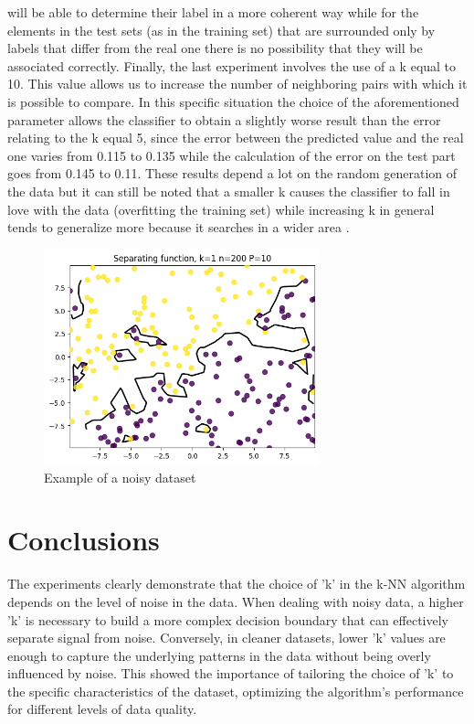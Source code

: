 \documentclass[a4paper,10pt,oneside]{article}
\begin{document}
will be able to determine their label in a more coherent way while for the elements 
in the test sets (as in the training set) that are surrounded only by labels that differ 
from the real one there is no possibility that they will be associated correctly.
Finally, the last experiment involves the use of a k equal to 10. 
This value allows us to increase the number of neighboring pairs with which it
is possible to compare. In this specific situation the choice of the aforementioned 
parameter allows the classifier to obtain a slightly worse result than the error 
relating to the k equal 5, since the error between the predicted value and the real 
one varies from 0.115 to 0.135 while the calculation of the error on the test part 
goes from 0.145 to 0.11.
These results depend a lot on the random generation of the data but it can still 
be noted that a smaller k causes the classifier to fall in love with the data 
(overfitting the training set) while increasing k in general tends to generalize 
more because it searches in a wider area . \\
\begin{figure}[h]
  \includegraphics[width=8cm]{second_experiment.png}
  \caption{ Example of a noisy dataset }
\end{figure}

\section{ Conclusions }
\label{sec:majhead}

The experiments clearly demonstrate that the choice of 'k' in the k-NN 
algorithm depends on the level of noise in the data. When dealing with 
noisy data, a higher 'k' is necessary to build a more complex decision 
boundary that can effectively separate signal from noise. Conversely, 
in cleaner datasets, lower 'k' values are enough to capture the underlying 
patterns in the data without being overly influenced by noise. 
This showed the importance of tailoring the choice of 'k' to the specific 
characteristics of the dataset, optimizing the algorithm's performance 
for different levels of data quality.\\
\end{document}
